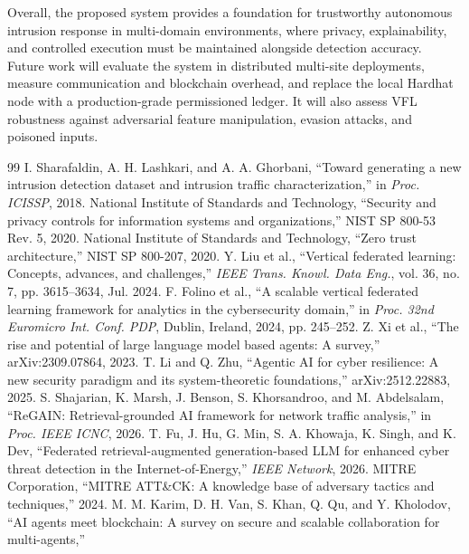 \documentclass[10pt, conference]{IEEEtran}
\begin{document}
Overall, the proposed system provides a foundation for trustworthy autonomous intrusion response in multi-domain environments, where privacy, explainability, and controlled execution must be maintained alongside detection accuracy.
Future work will evaluate the system in distributed multi-site deployments, measure communication and blockchain overhead, and replace the local Hardhat node with a production-grade permissioned ledger. It will also assess VFL robustness against adversarial feature manipulation, evasion attacks, and poisoned inputs.

\begin{thebibliography}{99}
I. Sharafaldin, A. H. Lashkari, and A. A. Ghorbani,
``Toward generating a new intrusion detection dataset and intrusion traffic characterization,''
in \textit{Proc. ICISSP}, 2018.
National Institute of Standards and Technology,
``Security and privacy controls for information systems and organizations,''
NIST SP 800-53 Rev. 5, 2020.
National Institute of Standards and Technology,
``Zero trust architecture,''
NIST SP 800-207, 2020.
Y. Liu et al.,
``Vertical federated learning: Concepts, advances, and challenges,''
\textit{IEEE Trans. Knowl. Data Eng.}, vol. 36, no. 7, pp. 3615--3634, Jul. 2024.
F. Folino et al.,
``A scalable vertical federated learning framework for analytics in the cybersecurity domain,''
in \textit{Proc. 32nd Euromicro Int. Conf. PDP}, Dublin, Ireland, 2024, pp. 245--252.
Z. Xi et al.,
``The rise and potential of large language model based agents: A survey,''
arXiv:2309.07864, 2023.
T. Li and Q. Zhu,
``Agentic AI for cyber resilience: A new security paradigm and its system-theoretic foundations,''
arXiv:2512.22883, 2025.
S. Shajarian, K. Marsh, J. Benson, S. Khorsandroo, and M. Abdelsalam,
``ReGAIN: Retrieval-grounded AI framework for network traffic analysis,''
in \textit{Proc. IEEE ICNC}, 2026.
T. Fu, J. Hu, G. Min, S. A. Khowaja, K. Singh, and K. Dev,
``Federated retrieval-augmented generation-based LLM for enhanced cyber threat detection in the Internet-of-Energy,''
\textit{IEEE Network}, 2026.
MITRE Corporation,
``MITRE ATT\&CK: A knowledge base of adversary tactics and techniques,''
2024.
M. M. Karim, D. H. Van, S. Khan, Q. Qu, and Y. Kholodov,
``AI agents meet blockchain: A survey on secure and scalable collaboration for multi-agents,''

\end{thebibliography}
\end{document}

